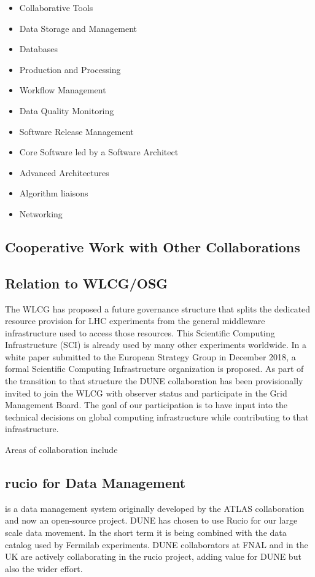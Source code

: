 \begin{itemize}
    \item 
Collaborative Tools
\item Data Storage and Management
\item Databases 
\item Production and Processing 
\item Workflow Management
\item Data Quality Monitoring 
\item Software Release Management 
\item Core Software led by a Software Architect
\item Advanced Architectures
\item Algorithm liaisons
\item Networking
\end{itemize}
\subsection{Cooperative Work with Other Collaborations	}
\label{ch:exec-comp-gov-coop}

\subsection{Relation to WLCG/OSG}
The WLCG has proposed a future governance structure that splits the dedicated resource provision for LHC experiments from the general middleware infrastructure used to access those resources.  This Scientific Computing Infrastructure (SCI) is already used by many other experiments worldwide.  In a white paper submitted to the European Strategy Group in December 2018\cite{SCI-EU}, a formal Scientific Computing Infrastructure organization is proposed. As part of the transition to that structure the DUNE collaboration has been provisionally invited to join the WLCG with observer status and participate in the Grid Management Board. The goal of our participation is to have input into the technical decisions on global computing infrastructure while contributing to that infrastructure. 

Areas of collaboration include

\subsection{rucio for Data Management}  %
\cite{rucio}
is a data management system originally developed by the ATLAS collaboration and now an open-source project.  DUNE has chosen to use Rucio for our large scale data movement.  In the short term it is being combined with the  data catalog used by Fermilab experiments.  DUNE collaborators at FNAL and in the UK are actively collaborating in the rucio project, adding value for DUNE but also the wider effort.

